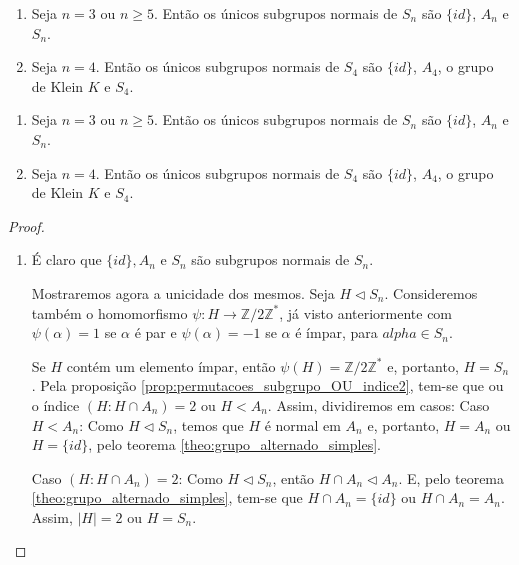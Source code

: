 \documentclass[11pt,openany]{book}
\newenvironment{novo}{
    \color{red}
}{}
\begin{document}
\begin{novo}
\begin{proposition}
\label{prop:S_n_subgrupos_normais}
    \begin{enumerate}[label=\alph*)]
        \item Seja $n = 3$ ou $n \geq 5$. Então os únicos subgrupos normais de $S_n$ são $\{id\}$, $A_n$ e $S_n$.
        \item Seja $n = 4$. Então os únicos subgrupos normais de $S_4$ são $\{id\}$, $A_4$, o grupo de Klein $K$ e $S_4$.
    \end{enumerate}
\end{proposition}
\begin{proposition}
\label{prop:S_n_subgrupos_normais}
    \begin{enumerate}[label=\alph*)]
        \item Seja $n = 3$ ou $n \geq 5$. Então os únicos subgrupos normais de $S_n$ são $\{id\}$, $A_n$ e $S_n$.
        \item Seja $n = 4$. Então os únicos subgrupos normais de $S_4$ são $\{id\}$, $A_4$, o grupo de Klein $K$ e $S_4$.
    \end{enumerate}
\end{proposition}
\begin{proof}
    \begin{enumerate}[label=\alph*)]
        \item É claro que $\{id\}, A_n$ e $S_n$ são subgrupos normais de $S_n$.
        
        Mostraremos agora a unicidade dos mesmos. Seja $H \triangleleft S_n$. Consideremos também o homomorfismo $\psi: H \rightarrow \mathbb{Z}/2\mathbb{Z}^*$, já visto anteriormente com $\psi(\alpha) = 1$ se $\alpha$ é par e $\psi(\alpha) = -1$ se $\alpha$ é ímpar, para $alpha \in S_n$.

        Se $H$ contém um elemento ímpar, então $\psi(H) = \mathbb{Z}/2\mathbb{Z}^*$ e, portanto, $H = S_n$. Pela proposição \ref{prop:permutacoes_subgrupo_OU_indice2}, tem-se que ou o índice $(H:H\cap A_n) = 2$ ou $H < A_n$. Assim, dividiremos em casos:
        Caso $H < A_n$: Como $H \triangleleft S_n$, temos que $H$ é normal em $A_n$ e, portanto, $H = A_n$ ou $H = \{id\}$, pelo teorema \ref{theo:grupo_alternado_simples}.

        Caso $(H:H\cap A_n) = 2$: Como $H \triangleleft S_n$, então $H \cap A_n \triangleleft A_n$. E, pelo teorema \ref{theo:grupo_alternado_simples}, tem-se que $H \cap A_n = \{id\}$ ou $H \cap A_n = A_n$. Assim, $|H| = 2$ ou $H = S_n$. 


\end{enumerate}
\end{proof}
\end{novo}
\end{document}

